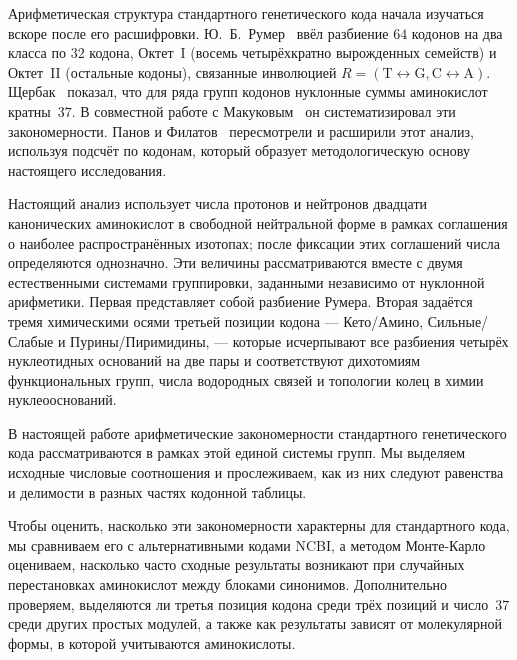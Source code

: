 \documentclass[11pt,a4paper]{article}
\renewcommand{\_}{\origunderscore\allowbreak}
\begin{document}
Арифметическая структура стандартного генетического кода начала изучаться вскоре после его расшифровки. Ю.~Б.~Румер~\cite{rumer1966,rumer1968}
ввёл разбиение $64$ кодонов на два класса по
$32$ кодона, Октет~I
(восемь четырёхкратно вырожденных семейств) и
Октет~II
(остальные кодоны), связанные инволюцией
$R = (\mathrm{T} \leftrightarrow
\mathrm{G}, \mathrm{C} \leftrightarrow
\mathrm{A})$. Щербак~\cite{shcherbak1993,shcherbak2003} показал, что для ряда групп
кодонов нуклонные суммы аминокислот кратны~$37$. В совместной работе
с Макуковым~\cite{makukov2013} он систематизировал эти закономерности. Панов и Филатов~\cite{panov2024} пересмотрели и
расширили этот анализ, используя подсчёт
по кодонам, который образует
методологическую основу настоящего
исследования.

Настоящий анализ использует числа протонов и нейтронов двадцати канонических аминокислот в свободной нейтральной форме в рамках соглашения о наиболее распространённых изотопах; после фиксации этих соглашений числа определяются однозначно. Эти величины рассматриваются вместе с двумя естественными системами группировки, заданными независимо от нуклонной арифметики.
Первая представляет собой разбиение Румера.
Вторая задаётся тремя химическими осями
третьей позиции кодона ---
Кето/Амино, Сильные/Слабые и
Пурины/Пиримидины, --- которые исчерпывают
все разбиения четырёх нуклеотидных оснований
на две пары и соответствуют дихотомиям
функциональных групп, числа водородных
связей и топологии колец в химии
нуклеооснований.

В настоящей работе арифметические
закономерности стандартного генетического кода
рассматриваются в рамках этой единой системы
групп. Мы выделяем исходные числовые
соотношения и прослеживаем, как из них следуют
равенства и делимости в разных частях
кодонной таблицы.

Чтобы оценить, насколько эти закономерности
характерны для стандартного кода, мы
сравниваем его с альтернативными кодами NCBI,
а методом Монте-Карло оцениваем, насколько
часто сходные результаты возникают при
случайных перестановках аминокислот между
блоками синонимов. Дополнительно проверяем,
выделяются ли третья позиция кодона среди
трёх позиций и число~$37$ среди других
простых модулей, а также как результаты
зависят от молекулярной формы, в которой
учитываются аминокислоты.
\end{document}
